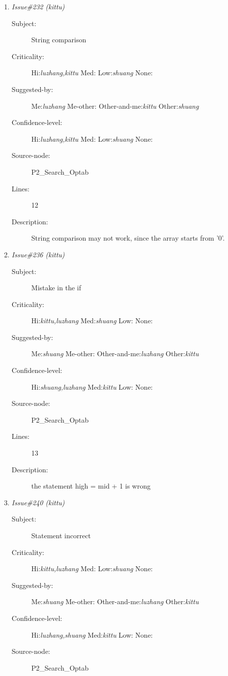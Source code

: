 \begin{enumerate}
\begin{description}
\item [Lines:] 58

\item [Description:] The function doesn't return the error condition.
\end{description}
\item {\it Issue\#232 (kittu)}
\begin{description}
\item [Subject:] String comparison
\item [Criticality:] Hi:{\it luzhang,kittu} Med:{\it } Low:{\it shuang} None:{\it }
\item [Suggested-by:] Me:{\it luzhang} Me-other:{\it } Other-and-me:{\it kittu} Other:{\it shuang}
\item [Confidence-level:] Hi:{\it luzhang,kittu} Med:{\it } Low:{\it shuang} None:{\it }
\item [Source-node:] P2\_Search\_Optab

\item [Lines:] 12

\item [Description:] String comparison may not work, since the
array starts from '0'.
\end{description}
\item {\it Issue\#236 (kittu)}
\begin{description}
\item [Subject:] Mistake in the if
\item [Criticality:] Hi:{\it kittu,luzhang} Med:{\it shuang} Low:{\it } None:{\it }
\item [Suggested-by:] Me:{\it shuang} Me-other:{\it } Other-and-me:{\it luzhang} Other:{\it kittu}
\item [Confidence-level:] Hi:{\it shuang,luzhang} Med:{\it kittu} Low:{\it } None:{\it }
\item [Source-node:] P2\_Search\_Optab

\item [Lines:] 13

\item [Description:] the statement high = mid + 1 is wrong
\end{description}
\item {\it Issue\#240 (kittu)}
\begin{description}
\item [Subject:] Statement incorrect
\item [Criticality:] Hi:{\it kittu,luzhang} Med:{\it } Low:{\it shuang} None:{\it }
\item [Suggested-by:] Me:{\it shuang} Me-other:{\it } Other-and-me:{\it luzhang} Other:{\it kittu}
\item [Confidence-level:] Hi:{\it luzhang,shuang} Med:{\it kittu} Low:{\it } None:{\it }
\item [Source-node:] P2\_Search\_Optab


\end{description}
\end{enumerate}

